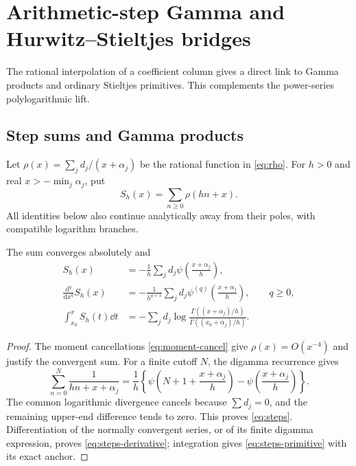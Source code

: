\section{Arithmetic-step Gamma and Hurwitz--Stieltjes bridges}
\label{sec:hurwitz}

The rational interpolation of a coefficient column gives a direct link to Gamma products and ordinary Stieltjes primitives. This complements the power-series polylogarithmic lift.

\subsection{Step sums and Gamma products}

Let $\rho(x)=\sum_jd_j/(x+\alpha_j)$ be the rational function in \eqref{eq:rho}. For $h>0$ and real $x> -\min_j\alpha_j$, put
\[
 S_h(x)=\sum_{n\ge0}\rho(hn+x).
\]
All identities below also continue analytically away from their poles, with compatible logarithm branches.

\begin{proposition}\label{prop:steps}
The sum converges absolutely and
\begin{align}
 S_h(x)&=-\frac1h\sum_jd_j\psi\left(\frac{x+\alpha_j}{h}\right),\label{eq:steps}\\
 \frac{\mathrm d^q}{\mathrm dx^q}S_h(x)
 &=-\frac1{h^{q+1}}\sum_jd_j\psi^{(q)}\left(\frac{x+\alpha_j}{h}\right),
 \qquad q\ge0,\label{eq:steps-derivative}\\
 \int_{x_0}^xS_h(t)\dd t
 &=-\sum_jd_j\log\frac{\Gamma((x+\alpha_j)/h)}
                              {\Gamma((x_0+\alpha_j)/h)}.\label{eq:steps-primitive}
\end{align}
\end{proposition}
\begin{proof}
The moment cancellations \eqref{eq:moment-cancel} give $\rho(x)=O(x^{-4})$ and justify the convergent sum. For a finite cutoff $N$, the digamma recurrence gives
\[
 \sum_{n=0}^{N}\frac1{hn+x+\alpha_j}
 =\frac1h\left\{\psi\left(N+1+\frac{x+\alpha_j}{h}\right)
                -\psi\left(\frac{x+\alpha_j}{h}\right)\right\}.
\]
The common logarithmic divergence cancels because $\sum d_j=0$, and the remaining upper-end difference tends to zero. This proves \eqref{eq:steps}. Differentiation of the normally convergent series, or of its finite digamma expression, proves \eqref{eq:steps-derivative}; integration gives \eqref{eq:steps-primitive} with its exact anchor.
\end{proof}

